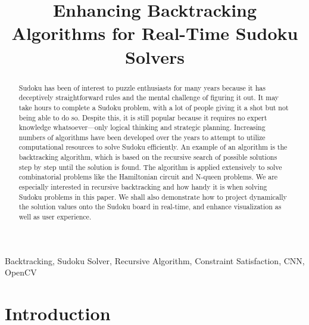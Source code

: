 \documentclass[conference]{IEEEtran}
\begin{document}
\title{Enhancing Backtracking Algorithms for Real-Time Sudoku Solvers}
\author{
    \and
    \and
}

\maketitle

\begin{abstract}
Sudoku has been of interest to puzzle enthusiasts for many years because it has deceptively straightforward rules and the mental challenge of figuring it out. It may take hours to complete a Sudoku problem, with a lot of people giving it a shot but not being able to do so. Despite this, it is still popular because it requires no expert knowledge whatsoever—only logical thinking and strategic planning. Increasing numbers of algorithms have been developed over the years to attempt to utilize computational resources to solve Sudoku efficiently. An example of an algorithm is the backtracking algorithm, which is based on the recursive search of possible solutions step by step until the solution is found. The algorithm is applied extensively to solve combinatorial problems like the Hamiltonian circuit and N-queen problems. We are especially interested in recursive backtracking and how handy it is when solving Sudoku problems in this paper. We shall also demonstrate how to project dynamically the solution values onto the Sudoku board in real-time, and enhance visualization as well as user experience.
\end{abstract}

\begin{IEEEkeywords}
Backtracking, Sudoku Solver, Recursive Algorithm, Constraint Satisfaction, CNN, OpenCV
\end{IEEEkeywords}

\section{Introduction}
\end{document}

